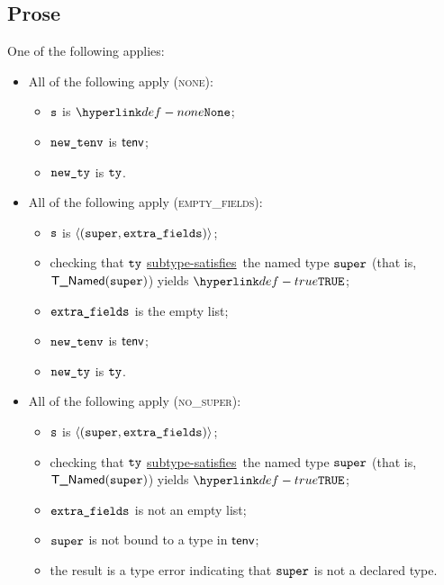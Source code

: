 \documentclass{book}
\newcommand\ProseOrTypeError[0]{\ProseTerminateAs{\TypeErrorConfig}}
\newcommand\subtypesatisfies[0]{\hyperlink{def-subtypesatisfies}{subtype-satisfies}}
\begin{document}
\subsection{Prose}
One of the following applies:
\begin{itemize}
  \item All of the following apply (\textsc{none}):
  \begin{itemize}
    \item $\texttt{s}$ is $\None$;
    \item $\texttt{new\_tenv}$ is $\textsf{tenv}$;
    \item $\texttt{new\_ty}$ is $\texttt{ty}$.
  \end{itemize}

  \item All of the following apply (\textsc{empty\_fields}):
  \begin{itemize}
    \item $\texttt{s}$ is $\langle(\texttt{super}, \texttt{extra\_fields})\rangle$;
    \item checking that $\texttt{ty}$ \subtypesatisfies\ the named type $\texttt{super}$ (that is, \\ $\textsf{T\_Named}(\texttt{super})$) yields
          $\True$\ProseOrTypeError;
    \item $\texttt{extra\_fields}$ is the empty list;
    \item $\texttt{new\_tenv}$ is $\textsf{tenv}$;
    \item $\texttt{new\_ty}$ is $\texttt{ty}$.
  \end{itemize}

  \item All of the following apply (\textsc{no\_super}):
  \begin{itemize}
    \item $\texttt{s}$ is $\langle(\texttt{super}, \texttt{extra\_fields})\rangle$;
    \item checking that $\texttt{ty}$ \subtypesatisfies\ the named type $\texttt{super}$ (that is, \\ $\textsf{T\_Named}(\texttt{super})$) yields
          $\True$\ProseOrTypeError;
    \item $\texttt{extra\_fields}$ is not an empty list;
    \item $\texttt{super}$ is not bound to a type in $\textsf{tenv}$;
    \item the result is a type error indicating that $\texttt{super}$ is not a declared type.
  \end{itemize}


\end{itemize}
\end{document}
